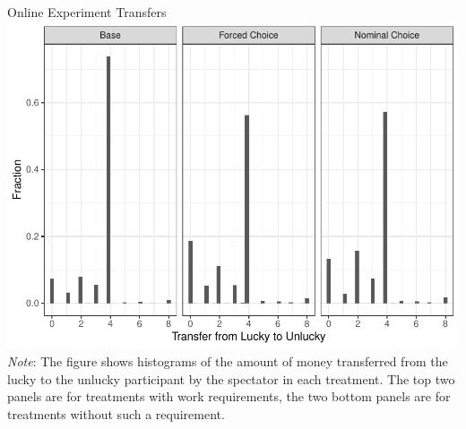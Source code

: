 \documentclass{beamer}
\begin{document}
\begin{frame}{Online Experiment Transfers}
	\includegraphics[height=.9\textheight]{../graphs/histograms_kantar.pdf}
	\emph{Note}: The figure shows histograms of the amount of money transferred from the lucky to
	the unlucky participant by the spectator in each treatment. The top two panels are for treatments
	with work requirements, the two bottom panels are for treatments without such a
	requirement.
\end{frame}
\end{document}
